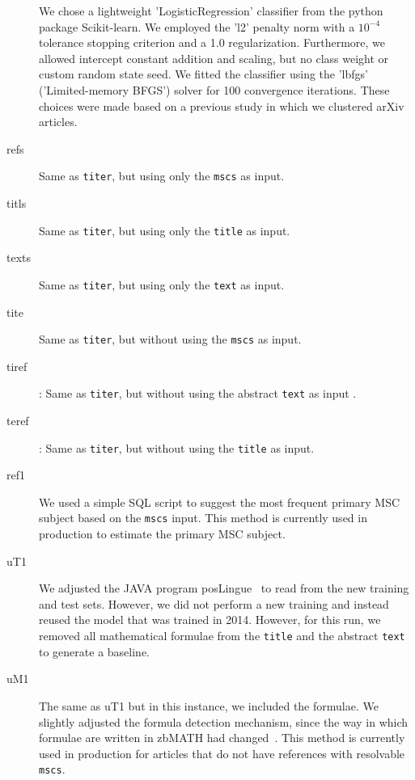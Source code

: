 \begin{description}
  We chose a lightweight 'LogisticRegression' classifier from the python package Scikit-learn.
  We employed the 'l2' penalty norm with a \(10^{- 4}\) tolerance stopping criterion and a 1.0 regularization.
  Furthermore, we allowed intercept constant addition and scaling, but no class weight or custom random state seed.
  We fitted the classifier using the 'lbfgs' ('Limited-memory BFGS') solver for 100 convergence iterations.
  These choices were made based on a previous study in which we clustered arXiv articles.
  \item[refs] Same as \texttt{titer}, but using only the \texttt{mscs} as input\footnotemark.
  \item[titls] Same as \texttt{titer}, but using only the \texttt{title} as input\footnotemark[\value{footnote}].
  \item[texts] Same as \texttt{titer}, but using only the \texttt{text} as input\footnotemark[\value{footnote}].
  \item[tite] Same as \texttt{titer}, but without using the \texttt{mscs} as input\footnotemark[\value{footnote}].
  \item[tiref]: Same as \texttt{titer}, but without using the abstract \texttt{text} as input \footnotemark[\value{footnote}].
  \item[teref]: Same as \texttt{titer}, but without using the \texttt{title} as input\footnotemark[\value{footnote}].
  \item[ref1] We used a simple SQL script to suggest the most frequent primary MSC subject based on the \texttt{mscs} input.
  This method is currently used in production to estimate the primary MSC subject.
  \item[uT1] 
  We adjusted the JAVA program posLingue~\cite{SchonebergS14} to read from the new training and test sets. However, we did not perform a new training and instead reused the model that was trained in 2014. However, for this run, we removed all mathematical formulae from the \texttt{title} and the abstract \texttt{text} to generate a baseline.
  \item[uM1]
  The same as uT1 but in this instance, we included the formulae.
  We slightly adjusted the formula detection mechanism, since the way in which formulae are written in zbMATH had changed~\cite{Schubotz2019b}.
  This method is currently used in production for articles that do not have references with resolvable \texttt{mscs}.
\end{description}

